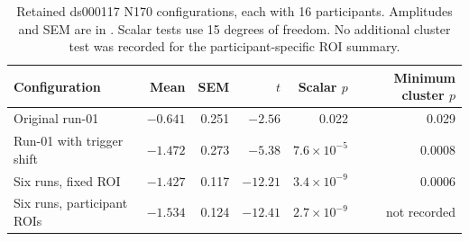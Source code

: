 \begin{table}[!htbp]
\centering\small
\caption{Retained ds000117 N170 configurations, each with 16 participants. Amplitudes and SEM are in \uV{}. Scalar tests use 15 degrees of freedom. No additional cluster test was recorded for the participant-specific ROI summary.}
\label{tab:adapted-n170}
\begin{tabular}{>{\raggedright\arraybackslash}p{4.7cm}rrrrr}
\toprule
Configuration & Mean & SEM & \(t\) & Scalar \(p\) & Minimum cluster \(p\)\\
\midrule
Original run-01 & \(-0.641\) & 0.251 & \(-2.56\) & 0.022 & 0.029\\
Run-01 with trigger shift & \(-1.472\) & 0.273 & \(-5.38\) & \(7.6\times10^{-5}\) & 0.0008\\
Six runs, fixed ROI & \(-1.427\) & 0.117 & \(-12.21\) & \(3.4\times10^{-9}\) & 0.0006\\
Six runs, participant ROIs & \(-1.534\) & 0.124 & \(-12.41\) & \(2.7\times10^{-9}\) & not recorded\\
\bottomrule
\end{tabular}
\end{table}
